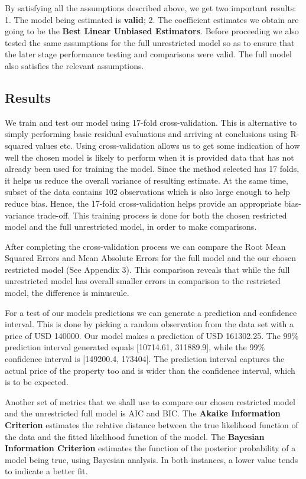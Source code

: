 \documentclass[letterpaper,9pt,twocolumn,twoside,]{pinp}
\begin{document}
By satisfying all the assumptions described above, we get two important
results: 1. The model being estimated is \textbf{valid}; 2. The
coefficient estimates we obtain are going to be the \textbf{Best Linear
Unbiased Estimators}. Before proceeding we also tested the same
assumptions for the full unrestricted model so as to ensure that the
later stage performance testing and comparisons were valid. The full
model also satisfies the relevant assumptions.

\hypertarget{results}{%
\subsection{\texorpdfstring{\textbf{Results}}{Results}}\label{results}}

We train and test our model using 17-fold cross-validation. This is
alternative to simply performing basic residual evaluations and arriving
at conclusions using R-squared values etc. Using cross-validation allows
us to get some indication of how well the chosen model is likely to
perform when it is provided data that has not already been used for
training the model. Since the method selected has 17 folds, it helps us
reduce the overall variance of resulting estimate. At the same time,
subset of the data contains 102 observations which is also large enough
to help reduce bias. Hence, the 17-fold cross-validation helps provide
an appropriate bias-variance trade-off. This training process is done
for both the chosen restricted model and the full unrestricted model, in
order to make comparisons.

After completing the cross-validation process we can compare the Root
Mean Squared Errors and Mean Absolute Errors for the full model and the
our chosen restricted model (See Appendix 3). This comparison reveals
that while the full unrestricted model has overall smaller errors in
comparison to the restricted model, the difference is minuscule.

For a test of our models predictions we can generate a prediction and
confidence interval. This is done by picking a random observation from
the data set with a price of USD 140000. Our model makes a prediction of
USD 161302.25. The 99\% prediction interval generated equals
{[}10714.61, 311889.9{]}, while the 99\% confidence interval is
{[}149200.4, 173404{]}. The prediction interval captures the actual
price of the property too and is wider than the confidence interval,
which is to be expected.

Another set of metrics that we shall use to compare our chosen
restricted model and the unrestricted full model is AIC and BIC. The
\textbf{Akaike Information Criterion} estimates the relative distance
between the true likelihood function of the data and the fitted
likelihood function of the model. The \textbf{Bayesian Information
Criterion} estimates the function of the posterior probability of a
model being true, using Bayesian analysis. In both instances, a lower
value tends to indicate a better fit.
\end{document}
